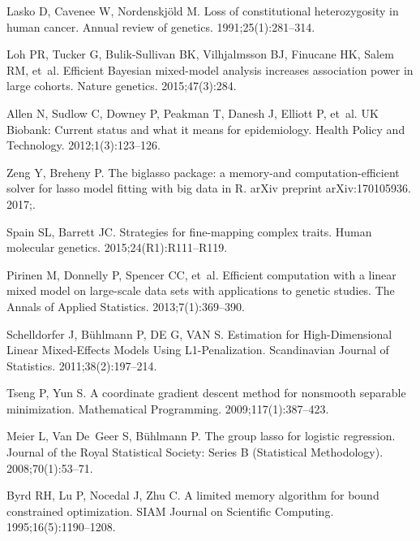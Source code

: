 \documentclass[10pt,letterpaper]{article}
\begin{document}
\begin{thebibliography}{10}
	Lasko D, Cavenee W, Nordenskj{\"o}ld M.
	\newblock Loss of constitutional heterozygosity in human cancer.
	\newblock Annual review of genetics. 1991;25(1):281--314.
	
	Loh PR, Tucker G, Bulik-Sullivan BK, Vilhjalmsson BJ, Finucane HK, Salem RM,
	et~al.
	\newblock Efficient Bayesian mixed-model analysis increases association power
	in large cohorts.
	\newblock Nature genetics. 2015;47(3):284.
	
	Allen N, Sudlow C, Downey P, Peakman T, Danesh J, Elliott P, et~al.
	\newblock UK Biobank: Current status and what it means for epidemiology.
	\newblock Health Policy and Technology. 2012;1(3):123--126.
	
	Zeng Y, Breheny P.
	\newblock The biglasso package: a memory-and computation-efficient solver for
	lasso model fitting with big data in R.
	\newblock arXiv preprint arXiv:170105936. 2017;.
	
	Spain SL, Barrett JC.
	\newblock Strategies for fine-mapping complex traits.
	\newblock Human molecular genetics. 2015;24(R1):R111--R119.
	
	Pirinen M, Donnelly P, Spencer CC, et~al.
	\newblock Efficient computation with a linear mixed model on large-scale data
	sets with applications to genetic studies.
	\newblock The Annals of Applied Statistics. 2013;7(1):369--390.
	
	Schelldorfer J, B{\"u}hlmann P, DE G, VAN S.
	\newblock Estimation for High-Dimensional Linear Mixed-Effects Models Using
	L1-Penalization.
	\newblock Scandinavian Journal of Statistics. 2011;38(2):197--214.
	
	Tseng P, Yun S.
	\newblock A coordinate gradient descent method for nonsmooth separable
	minimization.
	\newblock Mathematical Programming. 2009;117(1):387--423.
	
	Meier L, Van De~Geer S, B{\"u}hlmann P.
	\newblock The group lasso for logistic regression.
	\newblock Journal of the Royal Statistical Society: Series B (Statistical
	Methodology). 2008;70(1):53--71.
	
	Byrd RH, Lu P, Nocedal J, Zhu C.
	\newblock A limited memory algorithm for bound constrained optimization.
	\newblock SIAM Journal on Scientific Computing. 1995;16(5):1190--1208.
	

\end{thebibliography}
\end{document}

